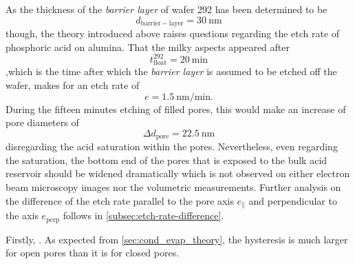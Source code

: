 \documentclass[../thesis.tex]{subfiles}
\begin{document}
        As the thickness of the \textit{barrier layer} of wafer 292 has been determined to be
        \begin{equation}
          d_\mathrm{barrier-layer}=\SI{30}{\nano\meter}
        \end{equation}
        though, the theory introduced above raises questions regarding the etch rate of phosphoric acid on alumina. That the milky aspects appeared after
        \begin{equation}
          t_\mathrm{float}^\mathrm{292}=\SI{20}{\minute}
        \end{equation}
        ,which is the time after which the \textit{barrier layer} is assumed to be etched off the wafer, makes for an etch rate of
        \begin{equation}
          e=\SI{1,5}{\nano\meter\per\minute}.
        \end{equation}
        During the fifteen minutes etching of filled pores, this would make an increase of pore diameters of
        \begin{equation}
          \Delta d_\mathrm{pore}=\SI{22,5}{\nano\meter}
        \end{equation}
        disregarding the acid saturation within the pores. Nevertheless, even regarding the saturation, the bottom end of the pores that is exposed to the bulk acid reservoir should be widened dramatically which is not observed on either electron beam microscopy images nor the volumetric measurements. Further analysis on the difference of the etch rate parallel to the pore axis $e_\mathrm{\parallel}$ and perpendicular to the axis $e_\mathrm{perp}$ follows in \cref{subsec:etch-rate-difference}.

        Firstly, . As expected from \cref{sec:cond_evap_theory}, the hysteresis is much larger for open pores than it is for closed pores.
        \medskip
\end{document}
